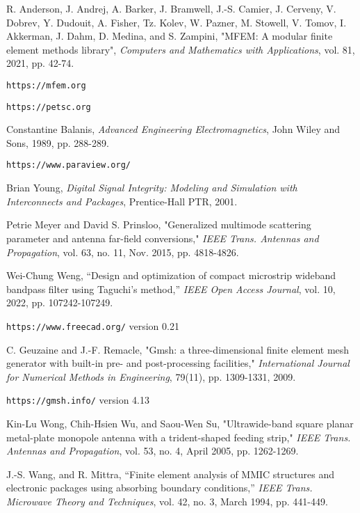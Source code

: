 \documentclass[titlepage]{article}
\renewcommand\_{\textunderscore\linebreak[1]}
\begin{document}
\begin{thebibliography}{unsrt}

 R. Anderson, J. Andrej, A. Barker, J. Bramwell, J.-S. Camier, J. Cerveny, V. Dobrev, Y. Dudouit, A. Fisher, Tz. Kolev, W. Pazner, M. Stowell, V. Tomov, I. Akkerman, J. Dahm, D. Medina, and S. Zampini, "MFEM: A modular finite element methods library", \textit{Computers and Mathematics with Applications}, vol. 81, 2021, pp. 42-74.

 \verb+https://mfem.org+

 \verb+https://petsc.org+

 Constantine Balanis, \textit{Advanced Engineering Electromagnetics}, John Wiley and Sons, 1989, pp. 288-289.

 \verb+https://www.paraview.org/+

 Brian Young, \textit{Digital Signal Integrity: Modeling and Simulation with Interconnects and Packages}, Prentice-Hall PTR, 2001.

 Petrie Meyer and David S. Prinsloo, "Generalized multimode scattering parameter and antenna far-field conversions," \textit{IEEE Trans. Antennas and Propagation}, vol. 63, no. 11, Nov. 2015, pp. 4818-4826.

 Wei-Chung Weng, “Design and optimization of compact microstrip wideband bandpass filter using Taguchi’s method,” \textit{IEEE Open Access Journal}, vol. 10, 2022, pp. 107242-107249.

 \verb+https://www.freecad.org/+ version 0.21

 C. Geuzaine and J.-F. Remacle, "Gmsh: a three-dimensional finite element mesh generator with built-in pre- and post-processing facilities," \textit{International Journal for Numerical Methods in Engineering}, 79(11), pp. 1309-1331, 2009.

 \verb+https://gmsh.info/+ version 4.13

 Kin-Lu Wong, Chih-Hsien Wu, and Saou-Wen Su, "Ultrawide-band square planar metal-plate monopole antenna with a trident-shaped feeding strip," \textit{IEEE Trans. Antennas and Propagation}, vol. 53, no. 4, April 2005, pp. 1262-1269.

 J.-S. Wang, and R. Mittra, “Finite element analysis of MMIC structures and electronic packages using absorbing boundary conditions,” \textit{IEEE Trans. Microwave Theory and Techniques}, vol. 42, no. 3, March 1994, pp. 441-449.


\end{thebibliography}
\end{document}
